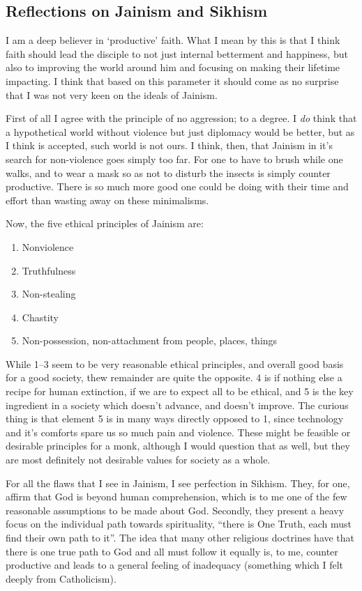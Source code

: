 \documentclass[12pt,letterpaper]{article}
\begin{document}
\begin{spacing}{2}
    \newpage
    \section{Reflections on Jainism and Sikhism}
    I am a deep believer in `productive' faith. What I mean by this is that I
    think faith should lead the disciple to not just internal betterment and
    happiness, but also to improving the world around him and focusing on making
    their lifetime impacting. I think that based on this parameter it should
    come as no surprise that I was not very keen on the ideals of Jainism.

    First of all I agree with the principle of no aggression; to a degree. I
    \emph{do} think that a hypothetical world without violence but just
    diplomacy would be better, but as I think is accepted, such world is not
    ours. I think, then, that Jainism in it's search for non-violence goes
    simply too far. For one to have to brush while one walks, and to wear a mask
    so as not to disturb the insects is simply counter productive. There is so
    much more good one could be doing with their time and effort than wasting
    away on these minimalisms.

    Now, the five ethical principles of Jainism are:
    \begin{enumerate}
        \item Nonviolence
        \item Truthfulness
        \item Non-stealing
        \item Chastity
        \item Non-possession, non-attachment from people, places, things
    \end{enumerate}

    While 1--3 seem to be very reasonable ethical principles, and overall
    good basis for a good society, thew remainder are quite the opposite. 4 is
    if nothing else a recipe for human extinction, if we are to expect all to be
    ethical, and 5 is the key ingredient in a society which doesn't advance, and
    doesn't improve. The curious thing is that element 5 is in many ways
    directly opposed to 1, since technology and it's comforts spare us so much
    pain and violence. These might be feasible or desirable principles for a
    monk, although I would question that as well, but they are most definitely
    not desirable values for society as a whole.

    For all the flaws that I see in Jainism, I see perfection in Sikhism. They,
    for one, affirm that God is beyond human comprehension, which is to me one
    of the few reasonable assumptions to be made about God. Secondly, they
    present a heavy focus on the individual path towards spirituality, ``there
    is One Truth, each must find their own path to it''. The idea that many
    other religious doctrines have that there is one true path to God and all
    must follow it equally is, to me, counter productive and leads to a general
    feeling of inadequacy (something which I felt deeply from Catholicism).


\end{spacing}
\end{document}
